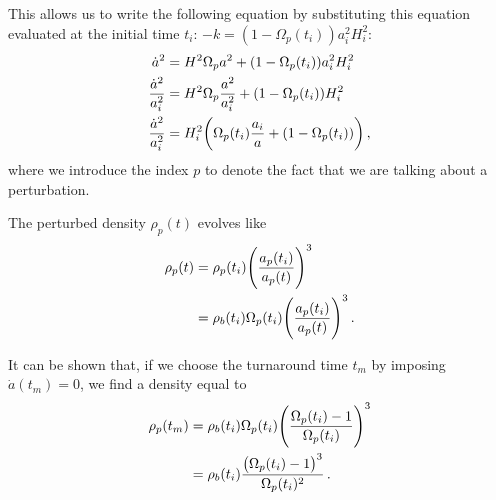 \documentclass[main.tex]{subfiles}
\begin{document}
This allows us to write the following equation by substituting this equation evaluated at the initial time \(t_i\): \(-k = (1-\Omega_p(t_i)) a^2_i H^2_i\):
%
\begin{align}
\dot{a}^2 &= H^2 \Omega_p a^2 + (1 - \Omega _p (t_i)) a^2_i H^2_i 
\\
\frac{\dot{a}^2}{a_i^2} &= H^2 \Omega_p \frac{a^2}{a_i^2} + (1 - \Omega _p(t_i)) H^2_i 
\\
\frac{\dot{a}^2 }{a_i^2} &= H_i^2 \qty(
    \Omega_{p} (t_i) \frac{a_i}{a} + (1 - \Omega_{p}(t_i))
)
\,,
\end{align}
%
where we introduce the index \(p\) to denote the fact that we are talking about a perturbation.


The perturbed density \(\rho _p (t)\) evolves like 
%
\begin{subequations}
\begin{align}
\rho_{p} (t) &= \rho_{p}(t_i) \qty(\frac{a_{p}(t_i)}{a_p(t)})^3  \\
&= \rho_{b} (t_i) \Omega_{p} (t_i) \qty(\frac{a_{p}(t_i)}{a_p(t)})^3
\,.
\end{align}
\end{subequations}

It can be shown that, if we choose the turnaround time \(t_m\) by imposing \(\dot{a}(t_m) = 0\), we find a density equal to
%
\begin{subequations}
\begin{align}
\rho_{p} (t_m) &= \rho_{b} (t_i) \Omega_{p}(t_i) \qty(\frac{\Omega_{p}(t_i) - 1}{\Omega_{p} (t_i)})^3  \\
&= \rho_{b}(t_i) \frac{\qty(\Omega_{p}(t_i) - 1)^3}{\Omega_{p}(t_i)^2}
\,.
\end{align}
\end{subequations}
%

\end{document}
